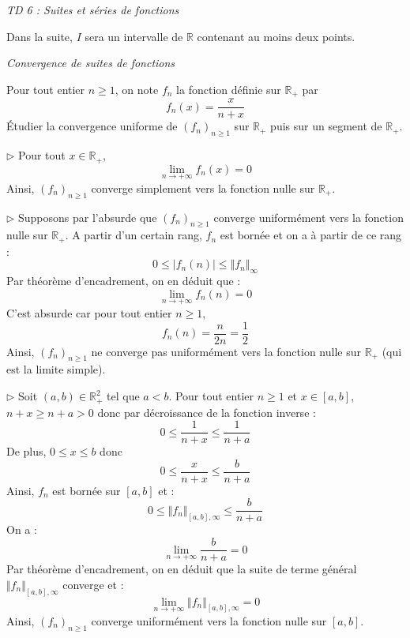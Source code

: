 \documentclass[a4paper,10pt]{report}
\begin{document}
\everymath{\displaystyle}


\begin{center}
\textit{{ {\huge TD 6 : Suites et séries de fonctions}}}
\end{center}


\bigskip

\noindent Dans la suite, $I$ sera un intervalle de $\mathbb{R}$ contenant au moins deux points.

\medskip

\begin{center}
\textit{{ {\large Convergence de suites de fonctions}}}
\end{center}


\begin{Exercice}{} Pour tout entier $n \geq 1$, on note $f_n$ la fonction définie sur $\mathbb{R}_+$ par 
$$ f_n(x) = \frac{x}{n+x}$$
Étudier la convergence uniforme de $(f_n)_{n \geq 1}$ sur $\mathbb{R}_+$ puis sur un segment de $\mathbb{R}_+$.
\end{Exercice}

\corr 

\noindent $\rhd$ Pour tout $x \in \mathbb{R}_+$,
$$ \lim_{n \rightarrow + \infty} f_n(x) = 0$$
Ainsi, $(f_n)_{n \geq 1}$ converge simplement vers la fonction nulle sur $\mathbb{R}_+$.

\medskip

\noindent $\rhd$ Supposons par l'absurde que $(f_n)_{n \geq 1}$ converge uniformément vers la fonction nulle sur $\mathbb{R}_+$. A partir d'un certain rang, $f_n$ est bornée et on a à partir de ce rang :
$$ 0 \leq \vert f_n(n) \vert \leq \Vert f_n \Vert_{\infty}$$
Par théorème d'encadrement, on en déduit que :
$$ \lim_{n \rightarrow + \infty} f_n(n) = 0$$
C'est absurde car pour tout entier $n \geq 1$,
$$ f_n(n) = \dfrac{n}{2n} = \dfrac{1}{2}$$
Ainsi,  $(f_n)_{n \geq 1}$ ne converge pas uniformément vers la fonction nulle sur $\mathbb{R}_+$ (qui est la limite simple).

\medskip

\noindent $\rhd$ Soit $(a,b) \in \mathbb{R}_+^2$ tel que $a <b$. Pour tout entier $n \geq 1$ et $x \in [a,b]$, $n+x \geq n+a>0$ donc par décroissance de la fonction inverse :
$$ 0 \leq \dfrac{1}{n+x} \leq \dfrac{1}{n+a}$$
De plus, $0 \leq x \leq b$ donc 
$$ 0 \leq \dfrac{x}{n+x} \leq \dfrac{b}{n+a}$$
Ainsi, $f_n$ est bornée sur $[a,b]$ et :
$$ 0 \leq \Vert f_n \Vert_{[a,b],\infty} \leq \dfrac{b}{n+a}$$
On a :
$$ \lim_{n \rightarrow + \infty}  \dfrac{b}{n+a} = 0$$
Par théorème d'encadrement, on en déduit que la suite de terme général $\Vert f_n \Vert_{[a,b],\infty}$ converge et :
$$ \lim_{n \rightarrow + \infty} \Vert f_n \Vert_{[a,b],\infty} = 0$$
Ainsi, $(f_n)_{n \geq 1}$ converge uniformément vers la fonction nulle sur $[a,b]$.
\end{document}
